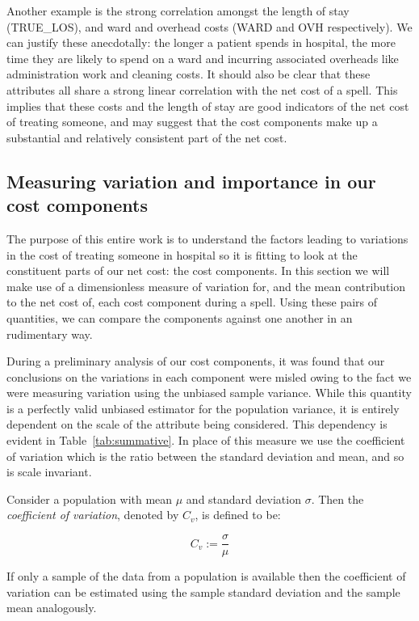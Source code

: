 Another example is the strong correlation amongst the length of stay
(TRUE\_LOS), and ward and overhead costs (WARD and OVH respectively). We can
justify these anecdotally: the longer a patient spends in hospital, the more
time they are likely to spend on a ward and incurring associated overheads like
administration work and cleaning costs. It should also be clear that these
attributes all share a strong linear correlation with the net cost of a spell.
This implies that these costs and the length of stay are good indicators of the
net cost of treating someone, and may suggest that the cost components make up a
substantial and relatively consistent part of the net cost.

\subsection{Measuring variation and importance in our cost components}

The purpose of this entire work is to understand the factors leading to
variations in the cost of treating someone in hospital so it is fitting to look
at the constituent parts of our net cost: the cost components. In this section
we will make use of a dimensionless measure of variation for, and the mean
contribution to the net cost of, each cost component during a spell. Using these
pairs of quantities, we can compare the components against one another in an
rudimentary way.

During a preliminary analysis of our cost components, it was found that our
conclusions on the variations in each component were misled owing to the fact we
were measuring variation using the unbiased sample variance. While this quantity
is a perfectly valid unbiased estimator for the population variance, it is
entirely dependent on the scale of the attribute being considered. This
dependency is evident in Table~\ref{tab:summative}. In place of this measure we
use the coefficient of variation which is the ratio between the standard
deviation and mean, and so is scale invariant.

\begin{definition}
    Consider a population with mean \(\mu\) and standard deviation \(\sigma\).
    Then the \emph{coefficient of variation}, denoted by \(C_v\), is defined to
    be:

    \[
        C_{v} := \frac{\sigma}{\mu}
    \]

    If only a sample of the data from a population is available then the
    coefficient of variation can be estimated using the sample standard
    deviation and the sample mean analogously.
\end{definition}

